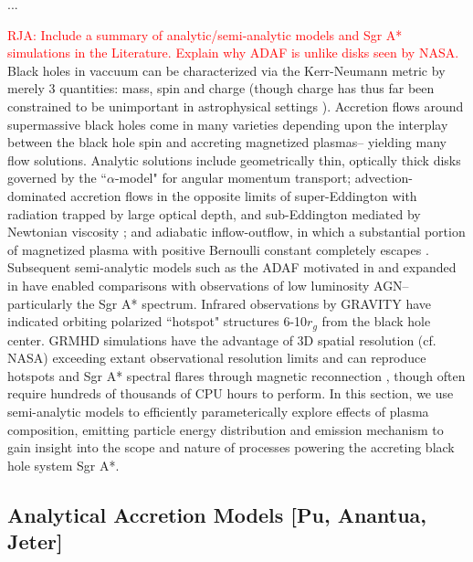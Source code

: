\documentclass[twocolumn,tighten,dvipsnames,linenumbers]{aastex63}
\begin{document}
...


\textcolor{red}{RJA: Include a summary of analytic/semi-analytic models and Sgr A* simulations in the Literature. Explain why ADAF is unlike disks seen by NASA.} Black holes in vaccuum can be characterized via the Kerr-Neumann metric by merely 3 quantities: mass, spin and charge (though charge has thus far been constrained to be unimportant in astrophysical settings \citep{Kocherlakota_2021}).  Accretion flows around supermassive black holes come in many varieties depending upon the interplay between the black hole spin and accreting magnetized plasmas-- yielding many flow solutions. Analytic solutions include geometrically thin, optically thick  \cite{Shakura1973} disks governed by the ``$\alpha$-model" for angular momentum transport; advection-dominated accretion flows in the opposite limits of super-Eddington with radiation trapped by large optical depth, and sub-Eddington mediated by Newtonian viscosity  \citep{1977ApJ...214..840I,1994ApJ...428L..13N,1998tbha.conf..148N}; and adiabatic inflow-outflow, in which a substantial portion of magnetized plasma with positive Bernoulli constant completely escapes  \citep{10.1046/j.1365-8711.1999.02358.x}. 
Subsequent semi-analytic models such as the ADAF motivated in \cite{Yuan2003} and expanded in \cite{Broderick2011} have enabled comparisons with observations of low luminosity AGN-- particularly the Sgr A* spectrum. Infrared observations by GRAVITY \citet{2019A&A...625L..10G} have indicated orbiting polarized ``hotspot" structures 6-10$r_g$ from the black hole center. GRMHD simulations have the advantage of 3D spatial resolution (cf. NASA) exceeding extant observational resolution limits and can reproduce hotspots and Sgr A* spectral flares through magnetic reconnection \cite{Ripperda2020}, though often require hundreds of thousands of CPU hours to perform. In this section, we use semi-analytic models to efficiently  parameterically explore effects of plasma composition, emitting particle energy distribution and emission mechanism to gain insight into the scope and nature of processes powering the  accreting black hole system Sgr A*.  

\subsection{Analytical Accretion Models
  [Pu, Anantua, Jeter]}
\label{sec:anamodels}
\end{document}
